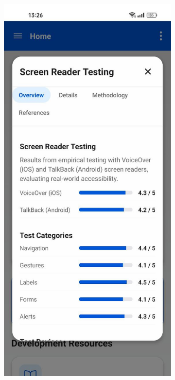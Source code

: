 \begin{figure}[ht]
    \centering
    \begin{subfigure}[b]{0.48\textwidth}
        \centering
        \includegraphics[width=\linewidth]{img/screen-reader-modal.jpg}

\end{subfigure}
\end{figure}
